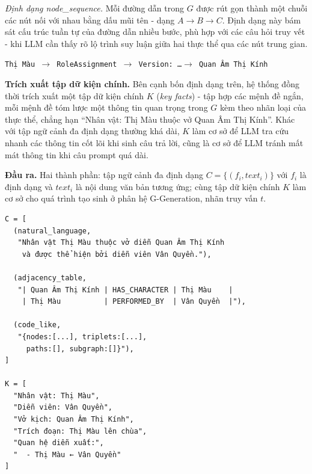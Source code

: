 \textit{Định dạng node\_sequence.} Mỗi đường dẫn trong $G$ được rút gọn thành một chuỗi các nút nối với nhau bằng dấu mũi tên - dạng $A \rightarrow B \rightarrow C$. Định dạng này bám sát cấu trúc tuần tự của đường dẫn nhiều bước, phù hợp với các câu hỏi truy vết - khi LLM cần thấy rõ lộ trình suy luận giữa hai thực thể qua các nút trung gian.

\vspace{0.5em}
\begin{tcolorbox}[colback=gray!5, colframe=black!50, arc=4pt, boxrule=0.5pt, left=4pt, right=4pt, top=4pt, bottom=4pt, boxsep=0pt]
\small \texttt{Thị Màu $\rightarrow$ RoleAssignment $\rightarrow$ Version: \ldots $\rightarrow$ Quan Âm Thị Kính}
\end{tcolorbox}

\textbf{Trích xuất tập dữ kiện chính.} Bên cạnh bốn định dạng trên, hệ thống đồng thời trích xuất một tập dữ kiện chính $K$ (\textit{key facts}) - tập hợp các mệnh đề ngắn, mỗi mệnh đề tóm lược một thông tin quan trọng trong $G$ kèm theo nhãn loại của thực thể, chẳng hạn ``Nhân vật: Thị Màu thuộc vở Quan Âm Thị Kính''. Khác với tập ngữ cảnh đa định dạng thường khá dài, $K$ làm cơ sở để LLM tra cứu nhanh các thông tin cốt lõi khi sinh câu trả lời, cũng là cơ sở để LLM tránh mất mát thông tin khi câu prompt quá dài.

\textbf{Đầu ra.} Hai thành phần: tập ngữ cảnh đa định dạng $C = \{(f_i, text_i)\}$ với $f_i$ là định dạng và $text_i$ là nội dung văn bản tương ứng; cùng tập dữ kiện chính $K$ làm cơ sở cho quá trình tạo sinh ở phân hệ G-Generation, nhãn truy vấn $t$.
\begin{tcolorbox}[colback=gray!5, colframe=black!50, arc=4pt, boxrule=0.5pt]
{\small
\begin{verbatim}
C = [
  (natural_language,
   "Nhân vật Thị Màu thuộc vở diễn Quan Âm Thị Kính
    và được thể hiện bởi diễn viên Vân Quyền."),

  (adjacency_table,
   "| Quan Âm Thị Kính | HAS_CHARACTER | Thị Màu    |
    | Thị Màu          | PERFORMED_BY  | Vân Quyền  |"),

  (code_like,
   "{nodes:[...], triplets:[...],
     paths:[], subgraph:[]}"),
]

K = [
  "Nhân vật: Thị Màu",
  "Diễn viên: Vân Quyền",
  "Vở kịch: Quan Âm Thị Kính",
  "Trích đoạn: Thị Màu lên chùa",
  "Quan hệ diễn xuất:",
  "  - Thị Màu ← Vân Quyền"
]
\end{verbatim}
}
\end{tcolorbox}

